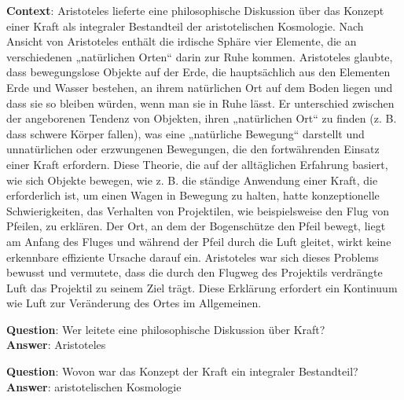 
\begin{examples}
  \label{ex:xquad}
  \item \textbf{Context}:
        Aristoteles lieferte eine philosophische Diskussion über das Konzept einer Kraft
        als integraler Bestandteil der aristotelischen Kosmologie. Nach Ansicht von Aristoteles enthält
        die irdische Sphäre vier Elemente, die an verschiedenen „natürlichen Orten“ darin zur Ruhe
        kommen. Aristoteles glaubte, dass bewegungslose Objekte auf der Erde, die hauptsächlich aus den
        Elementen Erde und Wasser bestehen, an ihrem natürlichen Ort auf dem Boden liegen und dass sie so
        bleiben würden, wenn man sie in Ruhe lässt. Er unterschied zwischen der angeborenen Tendenz von
        Objekten, ihren „natürlichen Ort“ zu finden (z. B. dass schwere Körper fallen), was eine
        „natürliche Bewegung“ darstellt und unnatürlichen oder erzwungenen Bewegungen, die den
        fortwährenden Einsatz einer Kraft erfordern. Diese Theorie, die auf der alltäglichen Erfahrung
        basiert, wie sich Objekte bewegen, wie z. B. die ständige Anwendung einer Kraft, die erforderlich
        ist, um einen Wagen in Bewegung zu halten, hatte konzeptionelle Schwierigkeiten, das Verhalten von
        Projektilen, wie beispielsweise den Flug von Pfeilen, zu erklären. Der Ort, an dem der
        Bogenschütze den Pfeil bewegt, liegt am Anfang des Fluges und während der Pfeil durch die Luft
        gleitet, wirkt keine erkennbare effiziente Ursache darauf ein. Aristoteles war sich dieses
        Problems bewusst und vermutete, dass die durch den Flugweg des Projektils verdrängte Luft das
        Projektil zu seinem Ziel trägt. Diese Erklärung erfordert ein Kontinuum wie Luft zur
        Veränderung des Ortes im Allgemeinen.

        \textbf{Question}: Wer leitete eine philosophische Diskussion über Kraft?\\
        \textbf{Answer}: Aristoteles

        \textbf{Question}: Wovon war das Konzept der Kraft ein integraler Bestandteil?\\
        \textbf{Answer}: aristotelischen Kosmologie


\end{examples}
